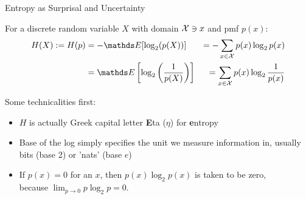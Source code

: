 \documentclass[11pt,compress,t,notes=noshow, xcolor=table]{beamer}
\begin{document}
\begin{vbframe}{Entropy as Surprisal and Uncertainty}


For a discrete random variable $X$ with domain $\mathcal{X} \ni x$ and pmf $p(x)$:
\begin{equation*}
\begin{aligned} 
  H(X) := H(p) &= - \E[\log_2(p(X))]           &= -\sum_{x \in \Xspace} p(x) \log_2 p(x)\\ 
               &=   \E\left[\log_2\left(\frac{1}{p(X)}\right)\right] &= \sum_{x \in \Xspace} p(x) \log_2 \frac{1}{p(x)} 
\end{aligned} 
\end{equation*}

Some technicalities first:

\begin{itemize}
\setlength\itemsep{1.2em} 
\item $H$ is actually Greek capital letter \textbf{E}ta ($\eta$) for \textbf{e}ntropy
\item Base of the log simply specifies the unit we measure information in, usually bits (base 2) or 'nats' (base $e$)
\item If $p(x) = 0$ for an $x$, then $p(x) \log_2 p(x)$ is taken to be zero,\\
because $\lim _{p \rightarrow 0} p \log_2 p=0$. %
\end{itemize}

  
\end{vbframe}
\end{document}
